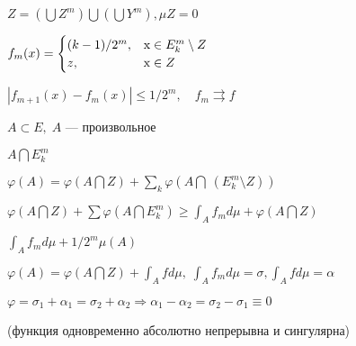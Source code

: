 $Z = (\bigcup Z^m) \bigcup (\bigcup Y^m), \mu Z = 0$


$f_m(x) =
\begin {cases}
(k-1)/2^m, &\text x \in E_k^m \setminus Z  \\
z, &\text x \in Z
\end {cases} $

$| f_{m+1} (x) - f_m(x) | \leqslant 1/2^m, \quad f_m
\rightrightarrows f$

$A \subset E, \; A$ --- произвольное

$A \bigcap E_k^m$

$\varphi(A) = \varphi (A \bigcap Z) + \sum_k \varphi (A \bigcap \:
(E_k^m \setminus Z))$ \fbox{ $\leqslant$}

$\varphi(A \bigcap Z) + \sum \varphi (A \bigcap E_k^m) \geqslant
\int_A f_m d \mu + \varphi(A \bigcap Z)$

\fbox{ $\leqslant$} $\int_A f_m d \mu + 1/2^m \mu (A)$

$\varphi(A) = \varphi(A \bigcap Z) + \int_A f d \mu, \; \int_A f_m
d \mu = \sigma, \int_A f d \mu = \alpha$

$\varphi = \sigma_1 + \alpha_1 = \sigma_2 + \alpha_2 \Rightarrow
\alpha_1 - \alpha_2 = \sigma_2 - \sigma_1 \equiv 0$

(функция одновременно абсолютно непрерывна и сингулярна)
